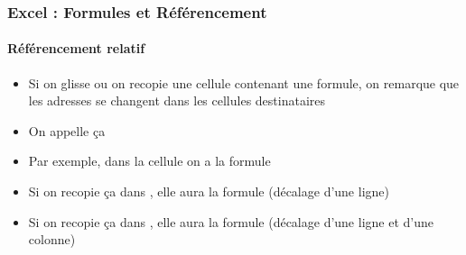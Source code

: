 \documentclass[xcolor=table, usenames,dvipsnames]{beamer}
\begin{document}
\begin{frame}
\frametitle{Excel : Formules et Référencement}
\framesubtitle{Référencement relatif}

\begin{minipage}{0.40\textwidth}
	\begin{itemize}
		\item Si on glisse ou on recopie une cellule contenant une formule, on remarque que les adresses se changent dans les cellules destinataires
	\end{itemize}
\end{minipage}
%
\begin{minipage}{0.59\textwidth}
\end{minipage}

\begin{itemize}
	\item On appelle ça 
	\item Par exemple, dans la cellule  on a la formule 
	\item Si on recopie ça dans , elle aura la formule  (décalage d'une ligne)
	\item Si on recopie ça dans , elle aura la formule  (décalage d'une ligne et d'une colonne)
\end{itemize}

\end{frame}
\end{document}
